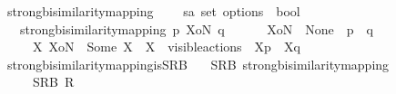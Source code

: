 \begin{isabellebody}
\endisatagproof
{\isafoldproof}%
%
\isadelimproof
%
\endisadelimproof
%
\isadelimdocument
%
\endisadelimdocument
%
\isatagdocument
%
\isamarkuptrue%
%
\endisatagdocument
{\isafolddocument}%
%
\isadelimdocument
%
\endisadelimdocument
{}\isamarkupfalse%
\ strong{\isacharunderscore}{\kern0pt}bisimilarity{\isacharunderscore}{\kern0pt}mapping\ %
\isanewline
\ \ {\isacharcolon}{\kern0pt}{\isacharcolon}{\kern0pt}\ {\isacartoucheopen}{\isacharprime}{\kern0pt}s{\isasymRightarrow}{\isacharprime}{\kern0pt}a\ set\ option{\isasymRightarrow}{\isacharprime}{\kern0pt}s\ {\isasymRightarrow}\ bool{\isacartoucheclose}\isanewline
\ \ \ {\isacartoucheopen}{\isacharparenleft}{\kern0pt}strong{\isacharunderscore}{\kern0pt}bisimilarity{\isacharunderscore}{\kern0pt}mapping{\isacharparenright}{\kern0pt}\ p\ XoN\ q\ \isanewline
\ \ \ \ {\isasymequiv}\ {\isacharparenleft}{\kern0pt}XoN\ {\isacharequal}{\kern0pt}\ None\ {\isasymand}\ {\isacharparenleft}{\kern0pt}{\isasymtheta}{\isacharparenleft}{\kern0pt}p{\isacharparenright}{\kern0pt}{\isacharparenright}{\kern0pt}\ {\isasymleftrightarrow}\ {\isacharparenleft}{\kern0pt}{\isasymtheta}{\isacharparenleft}{\kern0pt}q{\isacharparenright}{\kern0pt}{\isacharparenright}{\kern0pt}{\isacharparenright}{\kern0pt}\ {\isasymor}\isanewline
\ \ \ \ {\isacharparenleft}{\kern0pt}{\isasymexists}\ X{\isachardot}{\kern0pt}\ XoN\ {\isacharequal}{\kern0pt}\ Some\ X\ {\isasymand}\ X\ {\isasymsubseteq}\ visible{\isacharunderscore}{\kern0pt}actions\ {\isasymand}\ {\isacharparenleft}{\kern0pt}{\isasymtheta}{\isacharbrackleft}{\kern0pt}X{\isacharbrackright}{\kern0pt}{\isacharparenleft}{\kern0pt}p{\isacharparenright}{\kern0pt}{\isacharparenright}{\kern0pt}\ {\isasymleftrightarrow}\ {\isacharparenleft}{\kern0pt}{\isasymtheta}{\isacharbrackleft}{\kern0pt}X{\isacharbrackright}{\kern0pt}{\isacharparenleft}{\kern0pt}q{\isacharparenright}{\kern0pt}{\isacharparenright}{\kern0pt}{\isacharparenright}{\kern0pt}{\isacartoucheclose}\isanewline
\isanewline
{}\isamarkupfalse%
\ strong{\isacharunderscore}{\kern0pt}bisimilarity{\isacharunderscore}{\kern0pt}mapping{\isacharunderscore}{\kern0pt}is{\isacharunderscore}{\kern0pt}SRB{\isacharcolon}{\kern0pt}\isanewline
\ \ \ {\isacartoucheopen}SRB\ strong{\isacharunderscore}{\kern0pt}bisimilarity{\isacharunderscore}{\kern0pt}mapping{\isacartoucheclose}\isanewline
\ \ \ \ {\isacharparenleft}{\kern0pt}\ {\isacartoucheopen}SRB\ {\isacharquery}{\kern0pt}R{\isacartoucheclose}{\isacharparenright}{\kern0pt}\isanewline

\end{isabellebody}
